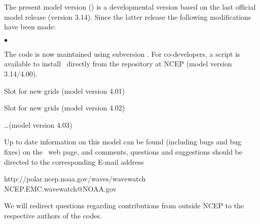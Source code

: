 \vspace{\baselineskip} 
\pb
\noindent 
The present model version (\WWver) is a developmental version based on the
last official model release (version 3.14). Since the latter release the
following modifications have been made:

\begin{list}{$\bullet$}{\rightmargin 5mm \parsep 0mm \itemsep 0mm}

\item
The code is now maintained using subversion \citep{bk:CSea06}. For
co-developers, a script is available to install \ws\ directly from the
repository at NCEP \citep[see][]{tol:MMAB09b} (model version 3.14/4.00).

\item
Slot for new grids (model version 4.01)

\item
Slot for new grids (model version 4.02)

\item
\ldots (model version 4.03)

\end{list}

%

\vspace{\baselineskip} \noindent 
Up to date information on this model can be found (including bugs and bug
fixes) on the \ws\ web page, and comments, questions and suggestions should be
directed to the corresponding E-mail address

\begin{center}
http://polar.ncep.noaa.gov/waves/wavewatch \\
NCEP.EMC.wavewatch@NOAA.gov
\end{center}

\noindent
We will redirect questions regarding contributions from outside NCEP to the
respective authors of the codes.


